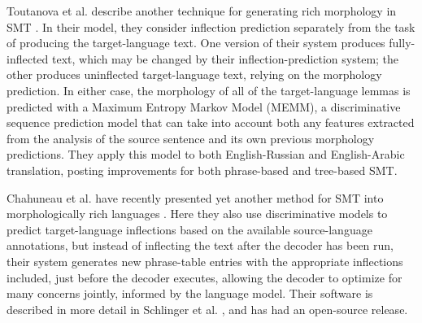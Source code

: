 Toutanova et al. describe another technique for generating rich morphology in
SMT \cite{toutanova-suzuki-ruopp:2008:ACLMain}. In their model, they consider
inflection prediction separately from the task of producing the target-language
text. One version of their system produces fully-inflected text, which may be
changed by their inflection-prediction system; the other produces uninflected
target-language text, relying on the morphology prediction. In either case, the
morphology of all of the target-language lemmas is predicted with a Maximum
Entropy Markov Model (MEMM), a discriminative sequence prediction model that
can take into account both any features extracted from the analysis of the
source sentence and its own previous morphology predictions. They apply this
model to both English-Russian and English-Arabic translation, posting
improvements for both phrase-based and tree-based SMT.

Chahuneau et al. have recently presented yet another method for SMT into
morphologically rich languages \cite{chahuneau-EtAl:2013:EMNLP}. Here they
also use discriminative models to predict target-language inflections based on
the available source-language annotations, but instead of inflecting the text
after the decoder has been run, their system generates new phrase-table entries
with the appropriate inflections included, just before the decoder executes,
allowing the decoder to optimize for many concerns jointly, informed by the
language model. Their software is described in more detail in Schlinger et al.
\cite{DBLP:journals/pbml/SchlingerCD13}, and has had an open-source release.
